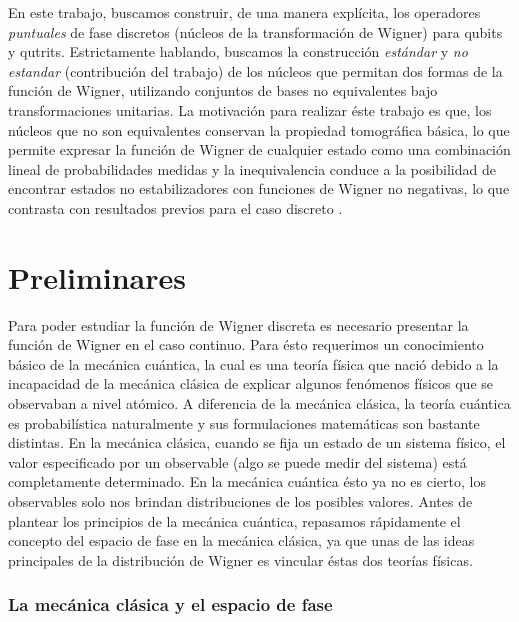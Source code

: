 \documentclass[a4paper]{report}
\begin{document}
  En este trabajo, buscamos construir, de una manera
  explícita, los operadores \textit{puntuales} de fase
  discretos (núcleos de la transformación de Wigner) para
  qubits y qutrits. Estrictamente hablando, buscamos la
  construcción \textit{estándar}
  \cite{woottersWignerFunctionFormulationFiniteState1987} y
  \textit{no estandar} (contribución del trabajo) de los
  núcleos que permitan dos formas de la función de Wigner,
  utilizando conjuntos de bases no equivalentes bajo
  transformaciones unitarias. La motivación para realizar
  éste trabajo es que, los núcleos que no son equivalentes
  conservan la propiedad tomográfica básica, lo que permite
  expresar la función de Wigner de cualquier estado como una
  combinación lineal de probabilidades medidas y la
  inequivalencia conduce a la posibilidad de encontrar
  estados no estabilizadores con funciones de Wigner no
  negativas, lo que contrasta con resultados previos para el
  caso discreto
  \cite{grossHudsonTheoremFinitedimensional2006,
  galvaoDiscreteWignerFunctions2005,
  cormickInterferenceDiscreteWigner2006}.

  \chapter{Preliminares}

  Para poder estudiar la función de Wigner discreta es
  necesario presentar la función de Wigner en el caso
  continuo. Para ésto requerimos un conocimiento básico de
  la mecánica cuántica, la cual es una teoría física que
  nació debido a la incapacidad de la mecánica clásica de
  explicar algunos fenómenos físicos que se observaban a
  nivel atómico. A diferencia de la mecánica clásica, la
  teoría cuántica es probabilística naturalmente y sus
  formulaciones matemáticas son bastante distintas. En la
  mecánica clásica, cuando se fija un estado de un sistema
  físico, el valor especificado por un observable (algo se
  puede medir del sistema) está completamente determinado.
  En la mecánica cuántica ésto ya no es cierto, los
  observables solo nos brindan distribuciones de los
  posibles valores. Antes de plantear los principios de la
  mecánica cuántica, repasamos rápidamente el concepto del
  espacio de fase en la mecánica clásica, ya que unas de las
  ideas principales de la distribución de Wigner es vincular
  éstas dos teorías físicas.

  \subsection{La mecánica clásica y el espacio de fase}
\end{document}
